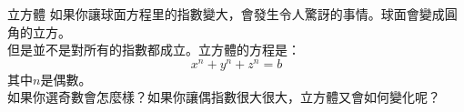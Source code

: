 \begin{surferPage}{立方體}
如果你讓球面方程里的指數變大，會發生令人驚訝的事情。球面會變成圓角的立方。\\
\vspace{0.3cm}
但是並不是對所有的指數都成立。立方體的方程是：
\[x^n+y^n+z^n=b\]
其中$n$是偶數。\\
\vspace{0.3cm}
如果你選奇數會怎麼樣？如果你讓偶指數很大很大，立方體又會如何變化呢？
\end{surferPage}
